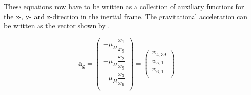 %
%

\noindent
These equations now have to be written as a collection of auxiliary functions for the x-, y- and z-direction in the inertial frame. The gravitational acceleration can be written as the vector shown by .

\begin{equation} \label{eq:gravAuxF}
\mathbf{a_{g}} =
\begin{pmatrix}
-\mu_{M}\dfrac{x_{1}}{x_{9}} \\
-\mu_{M}\dfrac{x_{2}}{x_{9}} \\
-\mu_{M}\dfrac{x_{3}}{x_{9}} \\
\end{pmatrix}
= 
\begin{pmatrix}
w_{4,39} \\
w_{5,1} \\
w_{6,1} \\
\end{pmatrix}
\end{equation}

